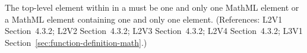 The top-level element within  in a \FunctionDefinition must be
one and only one MathML  element or a MathML
 element containing one and only one 
element.  (References: L2V1 Section~4.3.2; L2V2 Section~4.3.2;
L2V3 Section~4.3.2; L2V4 Section~4.3.2; L3V1 Section~\ref{sec:function-definition-math}.)
